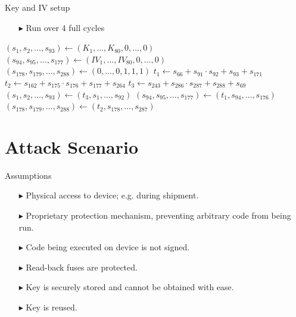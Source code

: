 \documentclass[10pt, compress]{beamer}
\begin{document}
    \begin{frame}{Key and IV setup}
        \begin{itemize}
            \item[$\blacktriangleright$] Run over 4 full cycles
        \end{itemize}
        \begin{center}
            \begin{minipage}{\textwidth}
                \begin{algorithm}[H]
                    \begin{algorithmic}[1]
                        \State $(s_1,s_2,\dots,s_{93}) \gets (K_1,\dots,K_{80},0,\dots,0)$ 
                        \State $(s_{94},s_{95},\dots,s_{177}) \gets (IV_1,\dots,IV_{80},0,\dots,0)$ 
                        \State $(s_{178},s_{179},\dots,s_{288}) \gets (0,\dots,0,1,1,1)$ 
                        \State
                        \State $t_1 \gets s_{66} + s_{91} \cdot s_{92} + s_{93} + s_{171}$
                        \State $t_2 \gets s_{162} + s_{175} \cdot s_{176} + s_{177} + s_{264}$
                        \State $t_3 \gets s_{243} + s_{286} \cdot s_{287} + s_{288}+ s_{69}$
                        \State
                        \State $(s_1,s_2,\dots,s_{93}) \gets (t_3,s_1,\dots,s_{92})$ 
                        \State $(s_{94},s_{95},\dots,s_{177}) \gets (t_1,s_{94},\dots,s_{176})$ 
                        \State $(s_{178},s_{179},\dots,s_{288}) \gets (t_2,s_{178},\dots,s_{287})$ 
                        \EndFor
                    \end{algorithmic}
                \end{algorithm}
            \end{minipage}
        \end{center}
    \end{frame}


    \section{Attack Scenario}

    \begin{frame}{Assumptions}
        \begin{itemize}[itemsep=0.5cm]
            \item[$\blacktriangleright$] Physical access to device; e.g. during shipment.
            \item[$\blacktriangleright$] Proprietary protection mechanism, preventing arbitrary code from being run.
            \item[$\blacktriangleright$] Code being executed on device is not signed.
            \item[$\blacktriangleright$] Read-back fuses are protected.
            \item[$\blacktriangleright$] Key is securely stored and cannot be obtained with ease.
            \item[$\blacktriangleright$] Key is reused.
        \end{itemize}
    \end{frame}
\end{document}
